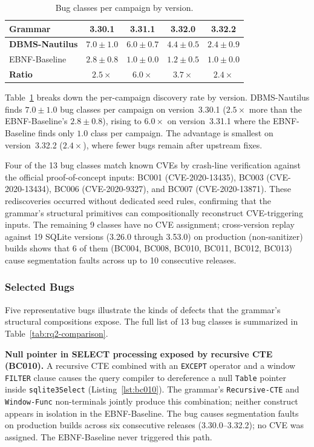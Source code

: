 \begin{table}[htbp]
\caption{Bug classes per campaign by version.}
\label{tab:rq2-per-run}
\centering
\begin{tabular}{lcccc}
\toprule
\textbf{Grammar} & \textbf{3.30.1} & \textbf{3.31.1} & \textbf{3.32.0} & \textbf{3.32.2} \\
\midrule
\textbf{DBMS-Nautilus} & $\mathbf{7.0 \pm 1.0}$ & $\mathbf{6.0 \pm 0.7}$ & $\mathbf{4.4 \pm 0.5}$ & $\mathbf{2.4 \pm 0.9}$ \\
EBNF-Baseline & $2.8 \pm 0.8$ & $1.0 \pm 0.0$ & $1.2 \pm 0.5$ & $1.0 \pm 0.0$ \\
\midrule
\textbf{Ratio} & $2.5\times$ & $6.0\times$ & $3.7\times$ & $2.4\times$ \\
\bottomrule
\end{tabular}
\end{table}

Table~\ref{tab:rq2-per-run} breaks down the per-campaign discovery rate by version. DBMS-Nautilus finds $7.0 \pm 1.0$ bug classes per campaign on version~3.30.1 ($2.5\times$ more than the EBNF-Baseline's $2.8 \pm 0.8$), rising to $6.0\times$ on version~3.31.1 where the EBNF-Baseline finds only $1.0$ class per campaign. The advantage is smallest on version~3.32.2 ($2.4\times$), where fewer bugs remain after upstream fixes.

Four of the 13 bug classes match known CVEs by crash-line verification against the official proof-of-concept inputs: BC001 (CVE-2020-13435), BC003 (CVE-2020-13434), BC006 (CVE-2020-9327), and BC007 (CVE-2020-13871). These rediscoveries occurred without dedicated seed rules, confirming that the grammar's structural primitives can compositionally reconstruct CVE-triggering inputs. The remaining 9 classes have no CVE assignment; cross-version replay against 19 SQLite versions (3.26.0 through 3.53.0) on production (non-sanitizer) builds shows that 6 of them (BC004, BC008, BC010, BC011, BC012, BC013) cause segmentation faults across up to 10 consecutive releases.

\subsubsection{Selected Bugs}

Five representative bugs illustrate the kinds of defects that the grammar's structural compositions expose. The full list of 13 bug classes is summarized in Table~\ref{tab:rq2-comparison}.

\textbf{Null pointer in SELECT processing exposed by recursive CTE (BC010).} A recursive CTE combined with an \texttt{EXCEPT} operator and a window \texttt{FILTER} clause causes the query compiler to dereference a null \texttt{Table} pointer inside \texttt{sqlite3Select} (Listing~\ref{lst:bc010}). The grammar's \texttt{Recursive-CTE} and \texttt{Window-Func} non-terminals jointly produce this combination; neither construct appears in isolation in the EBNF-Baseline. The bug causes segmentation faults on production builds across six consecutive releases (3.30.0--3.32.2); no CVE was assigned. The EBNF-Baseline never triggered this path.

